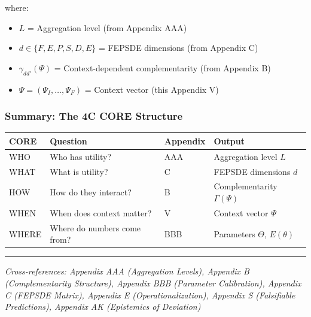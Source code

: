where:
\begin{itemize}
    \item $L$ = Aggregation level (from Appendix AAA)
    \item $d \in \{F, E, P, S, D, E\}$ = FEPSDE dimensions (from Appendix C)
    \item $\gamma_{dd'}(\Psi)$ = Context-dependent complementarity (from Appendix B)
    \item $\Psi = (\Psi_I, \ldots, \Psi_F)$ = Context vector (this Appendix V)
\end{itemize}

\subsubsection{Summary: The 4C CORE Structure}

\begin{center}
\begin{tabular}{llll}
\toprule
\textbf{CORE} & \textbf{Question} & \textbf{Appendix} & \textbf{Output} \\
\midrule
WHO & Who has utility? & AAA & Aggregation level $L$ \\
WHAT & What is utility? & C & FEPSDE dimensions $d$ \\
HOW & How do they interact? & B & Complementarity $\Gamma(\Psi)$ \\
WHEN & When does context matter? & V & Context vector $\Psi$ \\
WHERE & Where do numbers come from? & BBB & Parameters $\Theta$, $E(\theta)$ \\
\bottomrule
\end{tabular}
\end{center}

\vspace{0.5em}
\hrule
\vspace{0.5em}
\noindent\textit{Cross-references: Appendix AAA (Aggregation Levels), 
Appendix B (Complementarity Structure), Appendix BBB (Parameter Calibration),
Appendix C (FEPSDE Matrix), Appendix E (Operationalization), 
Appendix S (Falsifiable Predictions), Appendix AK (Epistemics of Deviation)}




